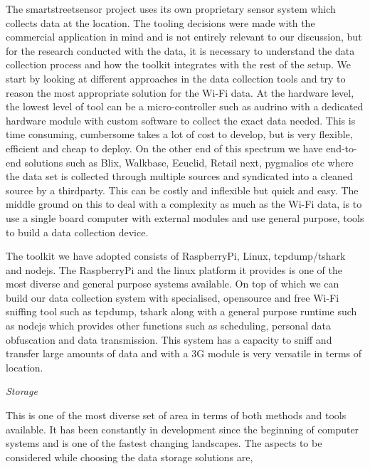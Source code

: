 The smartstreetsensor project uses its own proprietary sensor system which collects data at the location.
The tooling decisions were made with the commercial application in mind and is not entirely relevant to our discussion, but for the research conducted with the data, it is necessary to understand the data collection process and how the toolkit integrates with the rest of the setup.
We start by looking at different approaches in the data collection tools and try to reason the most appropriate solution for the Wi-Fi data.
At the hardware level, the lowest level of tool can be a micro-controller such as audrino with a dedicated hardware module with custom software to collect the exact data needed.
This is time consuming, cumbersome takes a lot of cost to develop, but is very flexible, efficient and cheap to deploy.
On the other end of this spectrum we have end-to-end solutions such as Blix, Walkbase, Ecuclid, Retail next, pygmalios etc where the data set is collected through multiple sources and syndicated into a cleaned source by a thirdparty.
This can be costly and inflexible but quick and easy.
The middle ground on this to deal with a complexity as much as the Wi-Fi data, is to use a single board computer with external modules and use general purpose, tools to build a data collection device.

The toolkit we have adopted consists of RaspberryPi, Linux, tcpdump/tshark and nodejs.
The RaspberryPi and the linux platform it provides is one of the most diverse and general purpose systems available.
On top of which we can build our data collection system with specialised, opensource and free Wi-Fi sniffing tool such as tcpdump, tshark along with a general purpose runtime such as nodejs which provides other functions such as scheduling, personal data obfuscation and data transmission.
This system has a capacity to sniff and transfer large amounts of data and with a 3G module is very versatile in terms of location.


\vspace{1.5em}\noindent\textit{Storage}\vspace{0.5em}

This is one of the most diverse set of area in terms of both methods and tools available.
It has been constantly in development since the beginning of computer systems and is one of the fastest changing landscapes.
The aspects to be considered while choosing the data storage solutions are,

